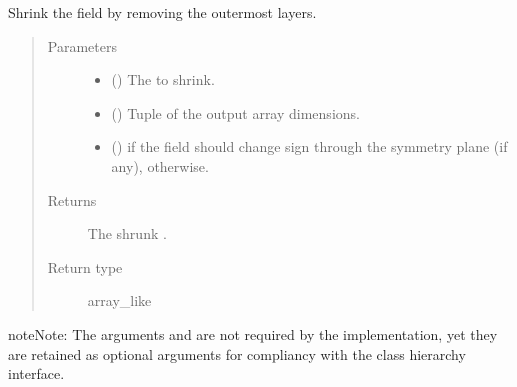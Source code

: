 \documentclass[letterpaper,10pt,english]{sphinxmanual}
\begin{document}
\begin{fulllineitems}
\begin{fulllineitems}
\label{\detokenize{api:dycore.horizontal_boundary_periodic.Periodic.from_computational_to_physical_domain}}
Shrink the field  by removing the  outermost layers.
\begin{quote}\begin{description}
\item[{Parameters}] \leavevmode\begin{itemize}
\item {} 
 () \textendash{} The  to shrink.

\item {} 
 () \textendash{} Tuple of the output array dimensions.

\item {} 
 () \textendash{}  if the field should change sign through the symmetry plane (if any),  otherwise.

\end{itemize}

\item[{Returns}] \leavevmode
The shrunk .

\item[{Return type}] \leavevmode
array\_like

\end{description}\end{quote}

\begin{sphinxadmonition}{note}{Note:}
The arguments  and  are not required by the implementation,
yet they are retained as optional arguments for compliancy with the class hierarchy interface.
\end{sphinxadmonition}

\end{fulllineitems}


\end{fulllineitems}
\end{document}
